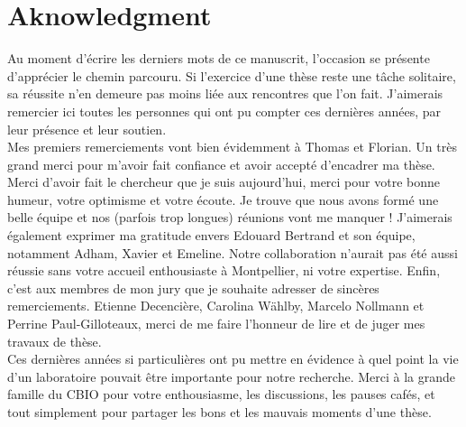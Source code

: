 
\chapter*{Aknowledgment}  \adjustmtc
{}

Au moment d'écrire les derniers mots de ce manuscrit, l'occasion se présente d'apprécier le chemin parcouru.
Si l'exercice d'une thèse reste une tâche solitaire, sa réussite n'en demeure pas moins liée aux rencontres que l'on fait.
J'aimerais remercier ici toutes les personnes qui ont pu compter ces dernières années, par leur présence et leur soutien.\\

Mes premiers remerciements vont bien évidemment à Thomas et Florian.
Un très grand merci pour m'avoir fait confiance et avoir accepté d'encadrer ma thèse.
Merci d'avoir fait le chercheur que je suis aujourd'hui, merci pour votre bonne humeur, votre optimisme et votre écoute.
Je trouve que nous avons formé une belle équipe et nos (parfois trop longues) réunions vont me manquer !
J'aimerais également exprimer ma gratitude envers Edouard Bertrand et son équipe, notamment Adham, Xavier et Emeline.
Notre collaboration n'aurait pas été aussi réussie sans votre accueil enthousiaste à Montpellier, ni votre expertise.
Enfin, c'est aux membres de mon jury que je souhaite adresser de sincères remerciements.
Etienne Decencière, Carolina Wählby, Marcelo Nollmann et Perrine Paul-Gilloteaux, merci de me faire l'honneur de lire et de juger mes travaux de thèse.\\

Ces dernières années si particulières ont pu mettre en évidence à quel point la vie d'un laboratoire pouvait être importante pour notre recherche.
Merci à la grande famille du CBIO pour votre enthousiasme, les discussions, les pauses cafés, et tout simplement pour partager les bons et les mauvais moments d'une thèse.

